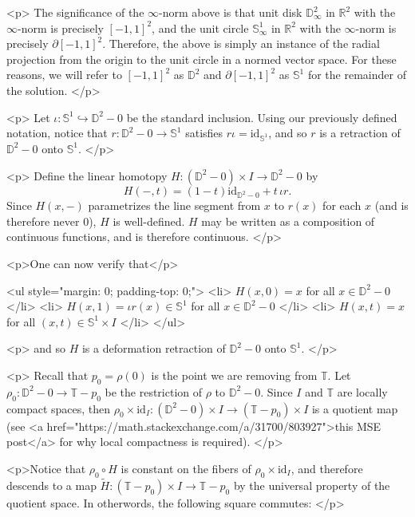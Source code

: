 <p>
    The significance of the $\infty$-norm above is that unit disk $\mathbb{D}^{2}_{\infty}$ in $\mathbb{R}^2$ with the
    $\infty$-norm is precisely $[-1,1]^{2}$, and the unit circle $\mathbb{S}^{1}_{\infty}$ in $\mathbb{R}^2$ with the
    $\infty$-norm is precisely $\partial[-1,1]^{2}$.
    Therefore, the above is simply an instance of the radial projection from the origin to the unit circle in a normed
    vector space. For these reasons, we will refer to $[-1,1]^{2}$ as $\mathbb{D}^{2}$ and $\partial [-1,1]^{2}$ as
    $\mathbb{S}^{1}$ for the remainder of the solution.
</p>

<p>
    Let $\iota : \mathbb{S}^1 \hookrightarrow \mathbb{D}^2 - 0$ be the standard inclusion. Using our previously defined
    notation, notice that $r : \mathbb{D}^2 - 0 \to \mathbb{S}^1$ satisfies $r \iota = \text{id}_{\mathbb{S}^1}$, and so
    $r$ is a retraction of $\mathbb{D}^2 - 0$ onto $\mathbb{S}^1$.
</p>

<p>
    Define the linear homotopy $H :(\mathbb{D}^{2} - 0) \times I \to \mathbb{D}^{2} - 0$ by
    $$H(-,t) = (1 - t)\text{id}_{\mathbb{D}^{2} - 0} + t\,\iota r.$$
    Since $H(x,-)$ parametrizes the line segment from $x$ to $r(x)$ for each $x$ (and is therefore never
    $0$), $H$ is well-defined. $H$ may be written as a composition of continuous functions, and is therefore
    continuous.
</p>

<p>One can now verify that</p>

<ul style="margin: 0; padding-top: 0;">
    <li>
        $H(x,0) = x$ for all $x \in \mathbb{D}^{2} - 0$
    </li>
    <li>
        $H(x,1) = \iota r(x) \in \mathbb{S}^{1}$ for all $x \in \mathbb{D}^{2} - 0$
    </li>
    <li>
        $H(x,t) = x$ for all $(x,t) \in \mathbb{S}^{1} \times I$
    </li>
</ul>

<p>
    and so $H$ is a deformation retraction of $\mathbb{D}^2 - 0$ onto $\mathbb{S}^{1}$.
</p>

<p>
    Recall that $p_{0} = \rho(0)$ is the point we are removing from $\mathbb{T}$. Let $\rho_{0} : \mathbb{D}^{2} - 0 \to
    \mathbb{T} - p_{0}$ be the restriction of $\rho$ to $\mathbb{D}^{2} - 0$. Since $I$ and $\mathbb{T}$ are
    locally compact spaces, then $\rho_0 \times \text{id}_{I} : (\mathbb{D}^2 - 0) \times I \to (\mathbb{T} - p_0)
    \times I$ is a quotient map (see <a href="https://math.stackexchange.com/a/31700/803927">this MSE post</a> for why
    local compactness is required).
</p>

<p>Notice that $\rho_0 \circ H$ is constant on the fibers of $\rho_0 \times
    \text{id}_{I}$, and therefore descends to a map $\widetilde{H} : (\mathbb{T} - p_0) \times I \to \mathbb{T} - p_0$
    by the universal property of the quotient space. In otherwords, the following square commutes:
</p>


